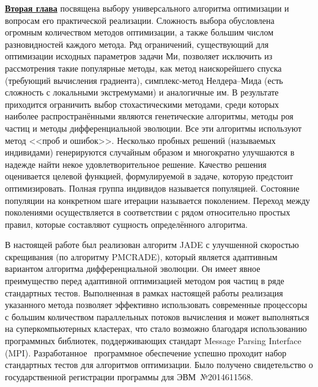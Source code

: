 \underline{\textbf{Вторая глава}} посвящена выбору универсального
алгоритма оптимизации и вопросам его практической
реализации. Сложность выбора обусловлена огромным количеством методов
оптимизации, а также большим числом разновидностей каждого
метода. Ряд ограничений, существующий для оптимизации исходных
параметров задачи Ми, позволяет исключить из рассмотрения такие
популярные методы, как метод наискорейшего спуска (требующий
вычисления градиента), симплекс-метод Нелдера--Мида (есть сложность с
локальными экстремумами) и аналогичные им. В результате приходится
ограничить выбор стохастическими методами, среди которых наиболее
распространёнными являются генетические алгоритмы, методы роя частиц и
методы дифференциальной эволюции.  Все эти алгоритмы используют метод
<<проб и ошибок>>.  Несколько пробных решений (называемых индивидами)
генерируются случайным образом и многократно улучшаются в надежде
найти некое удовлетворительное решение. Качество решения оценивается
целевой функцией, формулируемой в задаче, которую предстоит
оптимизировать.  Полная группа индивидов называется популяцией.
Состояние популяции на конкретном шаге итерации называется поколением.
Переход между поколениями осуществляется в соответствии с рядом
относительно простых правил, которые составляют сущность определённого
алгоритма.


В настоящей работе был реализован алгоритм JADE с улучшенной
скоростью скрещивания (по алгоритму PMCRADE), который является
адаптивным вариантом алгоритма дифференциальной эволюции. Он имеет
явное преимущество перед адаптивной оптимизацией методом роя частиц в
ряде стандартных тестов.  Выполненная в рамках настоящей работы
реализация указанного метода позволяет эффективно использовать
современные процессоры с большим количеством параллельных потоков
вычисления и может выполняться на суперкомпьютерных кластерах, что
стало возможно благодаря использованию программных библиотек,
поддерживающих стандарт Message Parsing Interface (MPI).
Разработанное~\cite{JADE-web} программное обеспечение успешно проходит
набор стандартных тестов для алгоритмов оптимизации.  Было получено
свидетельство о государственной регистрации программы для
ЭВМ~№2014611568.


